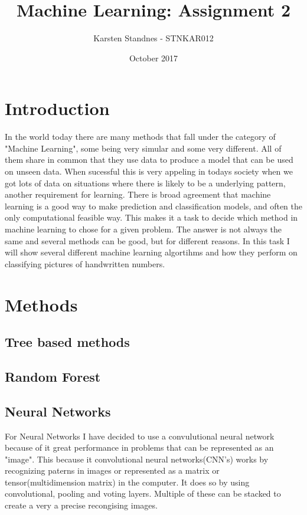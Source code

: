 \documentclass{article}
\title{Machine Learning:  Assignment 2}
\author{Karsten Standnes - STNKAR012}
\date{October 2017}
\begin{document}
\maketitle
\setlength\parindent{0pt}

\section{Introduction}

In the world today there are many methods that fall under the category of "Machine
Learning", some being very simular and some very different. All of them share in common
that they use data to produce a model that can be used on unseen data. When sucessful this
is very appeling in todays society when we got lots of data on situations where there is likely
to be a underlying pattern, another requirement for learning. There is broad agreement
that machine learning is a good way to make prediction and classification models, and often
the only computational feasible way. This makes it a task to decide which method in
machine learning to chose for a given problem. The answer is not always the same and
several methods can be good, but for different reasons. In this task I will show several
different machine learning algortihms and how they perform on classifying pictures
of handwritten numbers.

\section{Methods}

\subsection{Tree based methods}

\subsection{Random Forest}




\subsection{Neural Networks}
For Neural Networks I have decided to use a convulutional neural network because of
it great performance in problems that can be represented as an "image". This because it
convolutional neural networks(CNN's) works by recognizing paterns in images or represented as
a matrix or tensor(multidimension matrix) in the computer. It does so by using convolutional,
pooling and voting layers. Multiple of these can be stacked to create a very a precise recongising
images.
\end{document}
